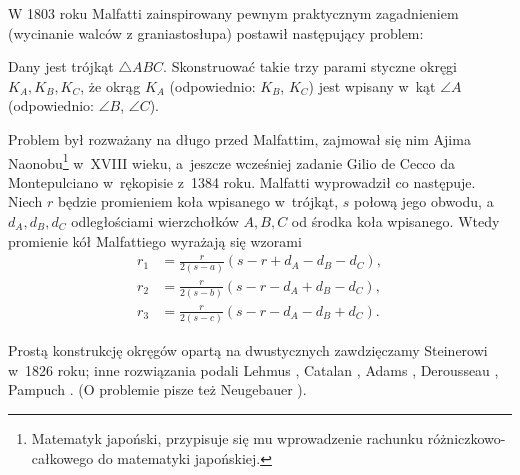 %

W 1803 roku Malfatti \cite{malfatti_1803} zainspirowany pewnym praktycznym zagadnieniem (wycinanie walców z graniastosłupa) postawił następujący problem:
%

\begin{problem}
	\label{malfatti_problem}
%
	Dany jest trójkąt $\triangle ABC$.
	Skonstruować takie trzy parami styczne okręgi $K_A, K_B, K_C$, że okrąg $K_A$ (odpowiednio: $K_B$, $K_C$) jest wpisany w~kąt $\angle A$ (odpowiednio: $\angle B$, $\angle C$).
\end{problem}

Problem był rozważany na długo przed Malfattim, zajmował się nim Ajima Naonobu\footnote{Matematyk japoński, przypisuje się mu wprowadzenie rachunku różniczkowo-całkowego do matematyki japońskiej.} w~XVIII wieku, a~jeszcze wcześniej zadanie Gilio de Cecco da Montepulciano w~rękopisie z~1384 roku.
%
%
Malfatti wyprowadził co następuje.
Niech $r$ będzie promieniem koła wpisanego w~trójkąt, $s$ połową jego obwodu, a~$d_A, d_B, d_C$ odległościami wierzchołków $A, B, C$ od środka koła wpisanego.
Wtedy promienie kół Malfattiego wyrażają się wzorami
\begin{align}
	r_1 & = {\frac {r}{2(s-a)}}(s-r+d_A-d_B-d_C), \\
	r_2 & = {\frac {r}{2(s-b)}}(s-r-d_A+d_B-d_C), \\
	r_3 & = {\frac {r}{2(s-c)}}(s-r-d_A-d_B+d_C).
\end{align}

Prostą konstrukcję okręgów opartą na dwustycznych zawdzięczamy Steinerowi \cite{steiner_1826} w~1826 roku;
%
inne rozwiązania podali Lehmus \cite{lehmus_1819}, Catalan \cite{catalan_1846}, Adams \cite{adams_1846}, Derousseau \cite{derousseau_1895}, Pampuch \cite{pampuch_1904}.
(O problemie pisze też Neugebauer \cite[s. 102]{neugebauer_2018}).


